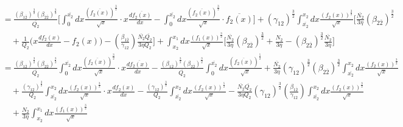 \documentclass[fleqn, 10pt]{article}
\begin{document}
            \begin{equation*}
            \begin{split}
            &=\frac{(\beta_{1\overline{2}})^\frac{3}{2} (\beta_{2\overline{2}})^\frac{3}{2}}{\overline{Q_2}} \Biggl[\int^{\overline{x_2}}_0 dx \frac{(\overline{f_2(x)})^\frac{3}{2}}{\sqrt{x}}\cdot x \frac{d\overline{f_2(x)}}{dx} - \int^{\overline{x_2}}_0 dx \frac{(\overline{f_2(x)})^\frac{3}{2}}{\sqrt{x}} \cdot \overline{f_2(x)} \Biggr] + (\gamma_{12})^\frac{3}{2} \int^{x_2}_{\overline{x_2}} dx \frac{(f_2(x))^\frac{3}{2}}{\sqrt{x}}\Biggl[\frac{\overline{N_2}}{3\eta}(\beta_{2\overline{2}})^\frac{3}{2} \\ & \quad + \frac{1}{Q_2} \biggl(x\frac{df_2(x)}{dx} - f_2(x)\biggr) - \left(\frac{\beta_{1\overline{2}}}{\gamma_{12}}\right) \frac{\overline{N_2}\overline{Q_2}}{3 \eta Q_2}\Biggr] + \int^{x_1}_{x_2} dx \frac{(f_1(x))^\frac{3}{2}}{\sqrt{x}} \Biggl[ \frac{\overline{N_2}}{3 \eta} (\beta_{2\overline{2}})^\frac{3}{2} + \frac{N_2}{3 \eta} - (\beta_{2\overline{2}})^\frac{3}{2} \frac{\overline{N_2}}{3 \eta} \Biggr]
            \end{split}
            \end{equation*}
            \begin{equation*}
            \begin{split}
            &= \frac{(\beta_{1\overline{2}})^\frac{3}{2} (\beta_{2\overline{2}})^\frac{3}{2}}{\overline{Q_2}} \int^{\overline{x_2}}_0 dx \frac{(\overline{f_2(x)})^\frac{3}{2}}{\sqrt{x}} \cdot x \frac{d\overline{f_2(x)}}{dx} - \frac{(\beta_{1\overline{2}})^\frac{3}{2} (\beta_{2\overline{2}})^\frac{3}{2}}{\overline{Q_2}} \int^{\overline{x_2}}_0 dx \frac{(\overline{f_2(x)})^\frac{5}{2}}{\sqrt{x}} + \frac{\overline{N_2}}{3\eta}(\gamma_{12})^\frac{3}{2} (\beta_{2\overline{2}})^\frac{3}{2} \int^{x_2}_{\overline{x_2}} dx \frac{(f_2(x))^\frac{3}{2}}{\sqrt{x}} \\ & \quad+ \frac{(\gamma_{12})^\frac{3}{2}}{Q_2} \int^{x_2}_{\overline{x_2}} dx \frac{(f_2(x))^\frac{3}{2}}{\sqrt{x}} \cdot x \frac{df_2(x)}{dx} - \frac{(\gamma_{12})^\frac{3}{2}}{Q_2} \int^{x_2}_{\overline{x_2}} dx \frac{(f_2(x))^\frac{5}{2}}{\sqrt{x}} - \frac{\overline{N_2}\overline{Q_2}}{3 \eta Q_2} (\gamma_{12})^\frac{3}{2} \left(\frac{\beta_{1\overline{2}}}{\gamma_{12}}\right) \int^{x_2}_{\overline{x_2}} dx \frac{(f_2(x))^\frac{3}{2}}{\sqrt{x}} \\ & \quad + \frac{N_2}{3 \eta} \int^{x_1}_{x_2} dx \frac{(f_1(x))^\frac{3}{2}}{\sqrt{x}}
            \end{split}
            \end{equation*}
\end{document}
